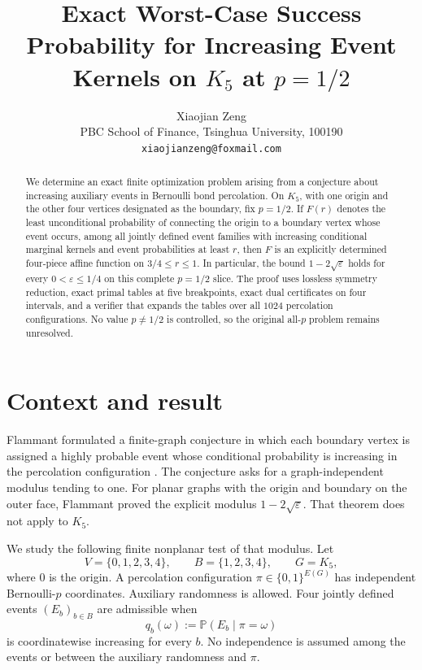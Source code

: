 \documentclass[11pt]{article}
\title{Exact Worst-Case Success Probability for Increasing Event Kernels on
  $K_5$ at $p=1/2$}
\author{Xiaojian Zeng\\
PBC School of Finance, Tsinghua University, 100190\\
\texttt{xiaojianzeng@foxmail.com}}
\date{}
\newcommand{\Prob}{\mathbb P}
\begin{document}
\maketitle

\begin{abstract}
We determine an exact finite optimization problem arising from a conjecture
about increasing auxiliary events in Bernoulli bond percolation.  On
$K_5$, with one origin and the other four vertices designated as the boundary,
fix $p=1/2$.  If $F(r)$ denotes the least unconditional probability of
connecting the origin to a boundary vertex whose event occurs, among all
jointly defined event families with increasing conditional marginal kernels
and event probabilities at least $r$, then $F$ is an explicitly determined
four-piece affine function on $3/4\leq r\leq1$.  In particular, the bound
$1-2\sqrt\varepsilon$ holds for every $0<\varepsilon\leq1/4$ on this
complete $p=1/2$ slice.  The proof uses lossless symmetry reduction, exact
primal tables at five breakpoints, exact dual certificates on four intervals,
and a verifier that expands the tables over all $1024$ percolation
configurations.  No value $p\neq1/2$ is controlled, so the original all-$p$
problem remains unresolved.
\end{abstract}

\section{Context and result}

Flammant formulated a finite-graph conjecture in which each boundary vertex
is assigned a highly probable event whose conditional probability is
increasing in the percolation configuration \cite{Flammant2026}.  The
conjecture asks for a graph-independent modulus tending to one.  For planar
graphs with the origin and boundary on the outer face, Flammant proved the
explicit modulus $1-2\sqrt\varepsilon$.  That theorem does not apply to
$K_5$.

We study the following finite nonplanar test of that modulus.  Let
\[
 V=\{0,1,2,3,4\},\qquad B=\{1,2,3,4\},\qquad G=K_5,
\]
where $0$ is the origin.  A percolation configuration
$\pi\in\{0,1\}^{E(G)}$ has independent Bernoulli-$p$ coordinates.  Auxiliary
randomness is allowed.  Four jointly defined events $(E_b)_{b\in B}$ are
admissible when
\[
 q_b(\omega):=\Prob(E_b\mid\pi=\omega)
\]
is coordinatewise increasing for every $b$.  No independence is assumed
among the events or between the auxiliary randomness and $\pi$.
\end{document}
